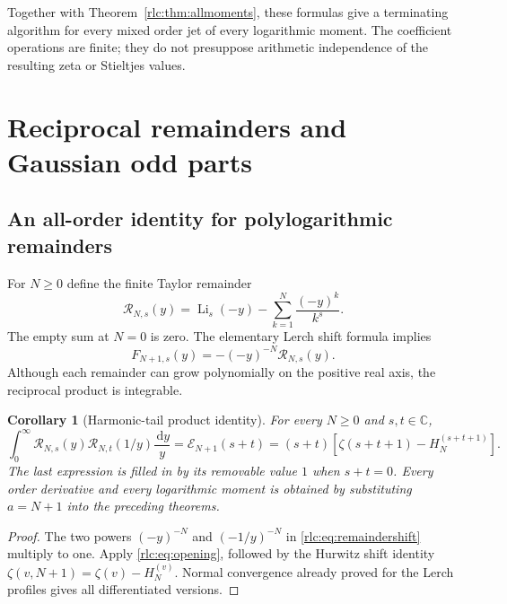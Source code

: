 \documentclass[11pt,a4paper]{article}
\numberwithin{equation}{section}
\newtheorem{corollary}[theorem]{Corollary}
\theoremstyle{definition}\newtheorem{definition}[theorem]{Definition}
\theoremstyle{remark}\newtheorem{remark}[theorem]{Remark}
\DeclareMathOperator{\Li}{Li}
\newcommand{\dd}{\,\mathrm d}
\newcommand{\C}{\mathbb C}\newcommand{\R}{\mathbb R}\newcommand{\N}{\mathbb N}
\newcommand{\E}{\mathcal E}
\begin{document}
Together with Theorem~\ref{rlc:thm:allmoments}, these formulas give a
terminating algorithm for every mixed order jet of every logarithmic
moment. The coefficient operations are finite; they do not presuppose
arithmetic independence of the resulting zeta or Stieltjes values.



\section{Reciprocal remainders and Gaussian odd parts}
\label{rlc:sec:harmonic}

\subsection{An all-order identity for polylogarithmic remainders}
For $N\ge0$ define the finite Taylor remainder
\begin{equation}\label{rlc:eq:remainderdef}
 \mathcal R_{N,s}(y)=\Li_s(-y)-\sum_{k=1}^{N}\frac{(-y)^k}{k^s}.
\end{equation}
The empty sum at $N=0$ is zero. The elementary Lerch shift formula
implies
\begin{equation}\label{rlc:eq:remaindershift}
 F_{N+1,s}(y)=-(-y)^{-N}\mathcal R_{N,s}(y).
\end{equation}
Although each remainder can grow polynomially on the positive real
axis, the reciprocal product is integrable.

\begin{corollary}[Harmonic-tail product identity]
\label{rlc:cor:remainders}
For every $N\ge0$ and $s,t\in\C$,
\begin{equation}\label{rlc:eq:remainderidentity}
 \boxed{\displaystyle
 \int_0^\infty\mathcal R_{N,s}(y)\mathcal R_{N,t}(1/y)
                  \frac{\dd y}{y}
 =\E_{N+1}(s+t)
 =(s+t)\left[\zeta(s+t+1)-H_N^{(s+t+1)}\right].}
\end{equation}
The last expression is filled in by its removable value $1$ when
$s+t=0$. Every order derivative and every logarithmic moment is obtained
by substituting $a=N+1$ into the preceding theorems.
\end{corollary}
\begin{proof}
The two powers $(-y)^{-N}$ and $(-1/y)^{-N}$ in
\eqref{rlc:eq:remaindershift} multiply to one. Apply
\eqref{rlc:eq:opening}, followed by the Hurwitz shift identity
$\zeta(v,N+1)=\zeta(v)-H_N^{(v)}$. Normal convergence already proved
for the Lerch profiles gives all differentiated versions.
\end{proof}
\end{document}
